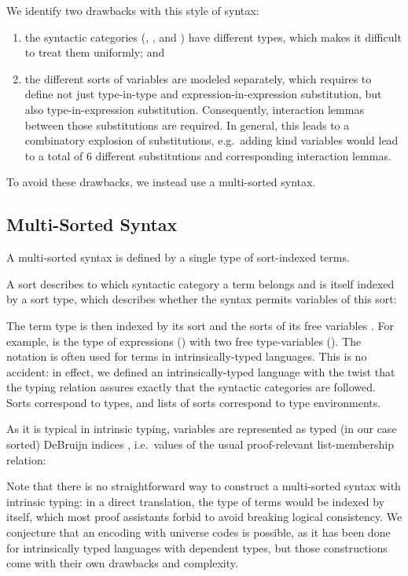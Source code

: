 \documentclass[sigplan,10pt, anonymous]{acmart}
\newenvironment{LibCode*}{%
  \begin{tcolorbox}[%
    colframe=white,%
    boxrule=0.0pt,%
    top=2.5pt,%
    left=2.5pt,%
    bottom=2.5pt,%
    right=2.5pt,%
    boxsep=0pt%
  ]\vspace{-0.2\baselineskip}%
}{%
  \vspace{-1\baselineskip}%
  \end{tcolorbox}%
}
\newcommand*\LibCode[1]{\begin{LibCode*}{#1}\end{LibCode*}}
\newcommand*\AppCode[1]{{#1}}
\newcommand*\ACode[1]{\AgdaFontStyle{\textcolor{mygray}{#1}}}
\newcommand*\ACon[1]{\AgdaInductiveConstructor{#1}}
\begin{document}
  We identify two drawbacks with this style of syntax:
  \begin{enumerate}
  \item
    the syntactic categories (\ACode{\ACon{Kind}},
    \ACode{\ACon{Type}}, and \ACode{\ACon{Expr}})
    have different types, which makes it difficult to treat them uniformly; and
  \item the different sorts of variables are modeled separately, which requires to define not just
    type-in-type and expression-in-expression substitution, but also type-in-expression substitution.
    Consequently, interaction lemmas between those substitutions are required.
    In general, this leads to a combinatory explosion of
    substitutions, e.g.\ adding kind variables would lead to a total of 6
    different substitutions and corresponding interaction lemmas.
  \end{enumerate}
  To avoid these drawbacks, we instead use a multi-sorted syntax.

  \subsection{Multi-Sorted Syntax}
  \label{sec:syntax:multi}
  A multi-sorted syntax is defined by a single type of sort-indexed terms.

  A sort describes to which syntactic category a term belongs and is
  itself indexed by a sort type, which describes whether the syntax
  permits variables of this sort:
  \LibCode\KSortTy
  \AppCode\FSort
  
  The term type \ACode{S \ACon{⊢} s} is then indexed by its sort
  \ACode{s} and the sorts of its free variables \ACode{S}.
  For example, \ACode{\ACon{[𝕥, 𝕥] ⊢ 𝕖}} is the type of expressions
  (\ACode{\ACon{𝕖}}) with two free type-variables (\ACode{\ACon{𝕥}}).
  \AppCode\FSyntax
  The notation \ACode{\ACon{\_⊢\_}} is often used for terms in
  intrinsically-typed languages. This is no accident: in effect, we
  defined an intrinsically-typed language with the twist that the
  typing relation assures exactly that the syntactic categories are followed.
  Sorts \ACode{s} correspond to types, and lists of sorts \ACode{S}
  correspond to type environments.

  As it is typical in intrinsic typing, variables are represented as
  typed (in our case sorted) DeBruijn indices \ACode{S \ACon{∋} s}, i.e.\
  values of the usual proof-relevant list-membership relation:
  \LibCode\KVariables

  Note that there is no straightforward way to construct a
  multi-sorted syntax with intrinsic typing: in a direct translation,
  the type of terms \ACode{\ACon{\_⊢\_}} would be indexed by itself, which
  most proof assistants forbid to avoid breaking logical consistency.
  We conjecture that an encoding with universe codes is possible, as
  it has been done for intrinsically typed languages with dependent
  types, but those constructions come with their own drawbacks and complexity.
\end{document}
